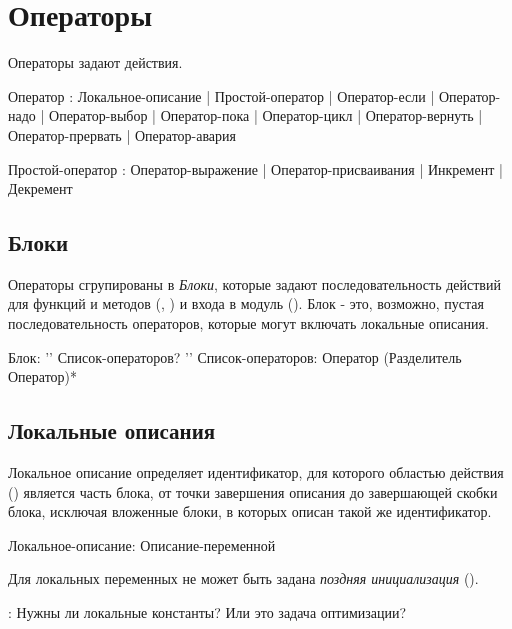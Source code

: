 \hypertarget{statements}{%
\section{Операторы}\label{stmt:chapter}}

Операторы задают действия.

\begin{Grammar}
Оператор
    : Локальное-описание
    | Простой-оператор
    | Оператор-если
    | Оператор-надо
    | Оператор-выбор
    | Оператор-пока
    | Оператор-цикл
    | Оператор-вернуть
    | Оператор-прервать
    | Оператор-авария

Простой-оператор
    : Оператор-выражение 
    | Оператор-присваивания
    | Инкремент 
    | Декремент
\end{Grammar}

\hypertarget{blocks}{%
\subsection{Блоки}\label{stmt:blocks}}

Операторы сгрупированы в \emph{Блоки}, которые задают последовательность действий для функций и методов (, ) и входа в модуль ().
Блок - это, возможно, пустая последовательность операторов, которые могут включать локальные описания.


\begin{Grammar}
Блок: '{' Список-операторов? '}'
Список-операторов: Оператор (Разделитель Оператор)* 
\end{Grammar}

\hypertarget{local-decls}{%
\subsection{Локальные описания}\label{stmt:local-decls}}

Локальное описание определяет идентификатор, для которого областью действия () является часть блока, 
от точки завершения описания до завершающей скобки блока, исключая вложенные блоки, в которых описан такой же идентификатор.

\begin{Grammar}
Локальное-описание: Описание-переменной
\end{Grammar}

Для локальных переменных не может быть задана \emph{поздняя инициализация} ().

\TBD: Нужны ли локальные константы? Или это задача оптимизации?

